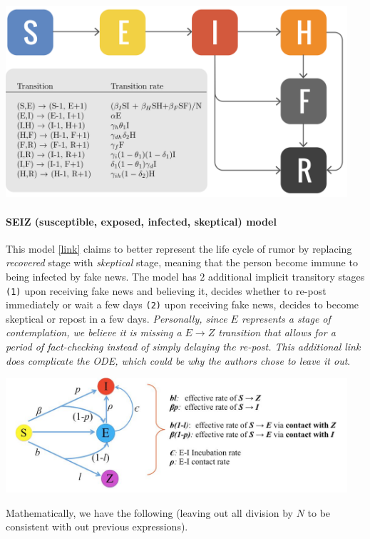 {
\centering
\includegraphics[width=0.95\textwidth]{notes/img/n3_ebola.png} \par
}

\paragraph{SEIZ (susceptible, exposed, infected, skeptical) model} This model \href{https://people.cs.vt.edu/naren/papers/news-rumor-epi-snakdd13.pdf}{[link]} claims to better represent the life cycle of rumor by replacing \textit{recovered} stage with \textit{skeptical} stage, meaning that the person become immune to being infected by fake news. The model has $2$ additional implicit transitory stages \texttt{(1)} upon receiving fake news and believing it, decides whether to re-post immediately or wait a few days \texttt{(2)} upon receiving fake news, decides to become skeptical or repost in a few days. \textit{Personally, since $E$ represents a stage of contemplation, we believe it is missing a $E \rightarrow Z$ transition that allows for a period of fact-checking instead of simply delaying the re-post. This additional link does complicate the ODE, which could be why the authors chose to leave it out}. 

{
\centering
\includegraphics[width=0.95\textwidth]{notes/img/n3_seiz.jpg} \par
}

Mathematically, we have the following (leaving out all division by $N$ to be consistent with out previous expressions).


